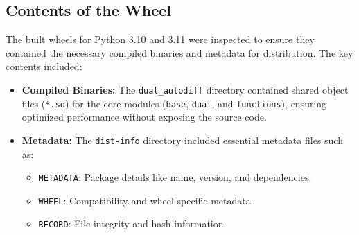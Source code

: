 \documentclass[a4paper,12pt]{article}
\begin{document}
\subsection{Contents of the Wheel}
The built wheels for Python 3.10 and 3.11 were inspected to ensure they contained the necessary compiled binaries and metadata for distribution. The key contents included:

\begin{itemize}
    \item \textbf{Compiled Binaries:} The \texttt{dual\_autodiff} directory contained shared object files (\texttt{*.so}) for the core modules (\texttt{base}, \texttt{dual}, and \texttt{functions}), ensuring optimized performance without exposing the source code.
    \item \textbf{Metadata:} The \texttt{dist-info} directory included essential metadata files such as:
    \begin{itemize}
        \item \texttt{METADATA}: Package details like name, version, and dependencies.
        \item \texttt{WHEEL}: Compatibility and wheel-specific metadata.
        \item \texttt{RECORD}: File integrity and hash information.
    \end{itemize}
\end{itemize}






\printbibliography
\end{document}
